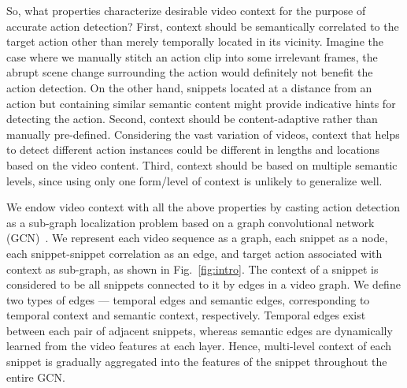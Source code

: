 \documentclass[10pt,twocolumn,letterpaper]{article}
\begin{document}
So, what properties characterize desirable video context for the purpose of accurate action detection? First, context should be semantically correlated to the target action other than merely temporally located in its vicinity. Imagine the case where we manually stitch an action clip into some irrelevant frames, the abrupt scene change surrounding the action would definitely not benefit the action detection. On the other hand, snippets located at a distance from an action but containing similar semantic content might provide indicative hints for detecting the action. Second, context should be content-adaptive rather than manually pre-defined. Considering the vast variation of videos, context that helps to detect different action instances could be different in lengths and locations based on the video content. Third, context should be based on multiple semantic levels, since using only one form/level of context is unlikely to generalize well.








We endow video context with all the above properties by casting action detection as a sub-graph localization problem based on a graph convolutional network (GCN)~\cite{kipf2016semi}. We represent each video sequence as a graph, each snippet as a node, each snippet-snippet correlation as an edge, and target action associated with context as sub-graph, as shown in Fig.~\ref{fig:intro}. The context of a snippet is considered to be all snippets connected to it by edges in a video graph. We define two types of edges --- temporal edges and semantic edges, corresponding to temporal context and semantic context, respectively. Temporal edges exist between each pair of adjacent snippets, whereas semantic edges are dynamically learned from the video features at each layer. Hence, multi-level context of each snippet is gradually aggregated into the features of the snippet throughout the entire GCN. 
\end{document}
